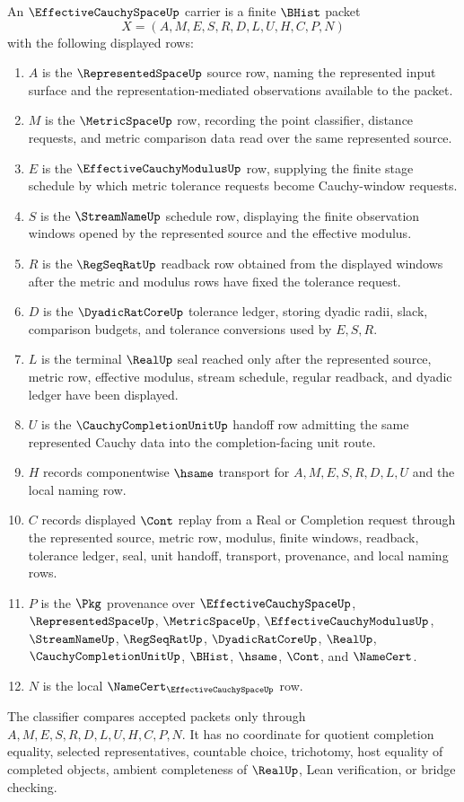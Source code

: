 \begin{definition}\label{def:effective-cauchy-space-carrier}
An $\EffectiveCauchySpaceUp$ carrier is a finite $\BHist$ packet
$$
X=(A,M,E,S,R,D,L,U,H,C,P,N)
$$
with the following displayed rows:
\begin{enumerate}
\item $A$ is the $\RepresentedSpaceUp$ source row, naming the represented input surface and the representation-mediated observations available to the packet.
\item $M$ is the $\MetricSpaceUp$ row, recording the point classifier, distance requests, and metric comparison data read over the same represented source.
\item $E$ is the $\EffectiveCauchyModulusUp$ row, supplying the finite stage schedule by which metric tolerance requests become Cauchy-window requests.
\item $S$ is the $\StreamNameUp$ schedule row, displaying the finite observation windows opened by the represented source and the effective modulus.
\item $R$ is the $\RegSeqRatUp$ readback row obtained from the displayed windows after the metric and modulus rows have fixed the tolerance request.
\item $D$ is the $\DyadicRatCoreUp$ tolerance ledger, storing dyadic radii, slack, comparison budgets, and tolerance conversions used by $E,S,R$.
\item $L$ is the terminal $\RealUp$ seal reached only after the represented source, metric row, effective modulus, stream schedule, regular readback, and dyadic ledger have been displayed.
\item $U$ is the $\CauchyCompletionUnitUp$ handoff row admitting the same represented Cauchy data into the completion-facing unit route.
\item $H$ records componentwise $\hsame$ transport for $A,M,E,S,R,D,L,U$ and the local naming row.
\item $C$ records displayed $\Cont$ replay from a Real or Completion request through the represented source, metric row, modulus, finite windows, readback, tolerance ledger, seal, unit handoff, transport, provenance, and local naming rows.
\item $P$ is the $\Pkg$ provenance over $\EffectiveCauchySpaceUp$, $\RepresentedSpaceUp$, $\MetricSpaceUp$, $\EffectiveCauchyModulusUp$, $\StreamNameUp$, $\RegSeqRatUp$, $\DyadicRatCoreUp$, $\RealUp$, $\CauchyCompletionUnitUp$, $\BHist$, $\hsame$, $\Cont$, and $\NameCert$.
\item $N$ is the local $\NameCert_{\EffectiveCauchySpaceUp}$ row.
\end{enumerate}
The classifier compares accepted packets only through $A,M,E,S,R,D,L,U,H,C,P,N$. It has no coordinate for quotient completion equality, selected representatives, countable choice, trichotomy, host equality of completed objects, ambient completeness of $\RealUp$, Lean verification, or bridge checking.
\end{definition}

